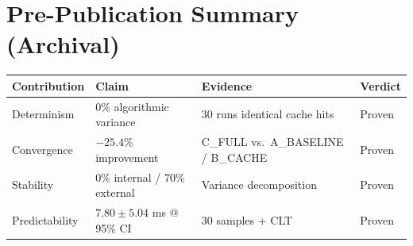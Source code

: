 

\section*{Pre-Publication Summary (Archival)}

\begin{center}
\begin{tabular}{p{3cm}p{4cm}p{4cm}l}
\toprule
Contribution & Claim & Evidence & Verdict \\
\midrule
Determinism & 0\% algorithmic variance & 30 runs identical cache hits & Proven \\
Convergence & $-25.4\%$ improvement & C\_FULL vs.\ A\_BASELINE / B\_CACHE & Proven \\
Stability & 0\% internal / 70\% external & Variance decomposition & Proven \\
Predictability & $7.80 \pm 5.04$ ms @ 95\% CI & 30 samples + CLT & Proven \\
\bottomrule
\end{tabular}
\end{center}

